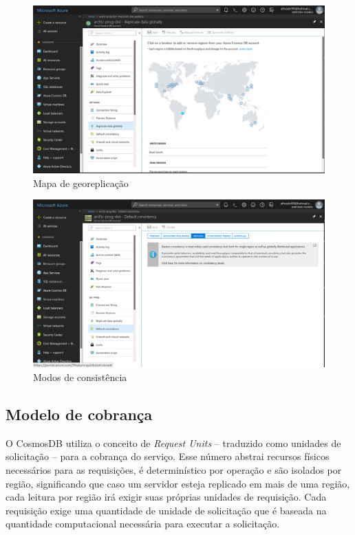 \documentclass[12pt]{article}
\begin{document}
\begin{figure}[H]
	\label{fig:az4}
	\caption{Mapa de georeplicação}
	\includegraphics[scale=0.27]{img/az4.png}
	\centering
\end{figure}

\begin{figure}[H]
	\label{fig:az5}
	\caption{Modos de consistência}
	\includegraphics[scale=0.27]{img/az5.png}
	\centering
\end{figure}

\subsection{Modelo de cobrança}
O CosmosDB utiliza o conceito de \textit{Request Units} -- traduzido como unidades de solicitação -- para a cobrança do serviço. Esse número abstrai recursos físicos necessários para as requisições, é 
determinístico por operação e são isolados por região, significando que caso um servidor esteja replicado em mais de uma região, cada leitura por região irá exigir suas próprias unidades de requisição.
Cada requisição exige uma quantidade de unidade de solicitação que é baseada na quantidade computacional necessária para executar a solicitação.
\end{document}
